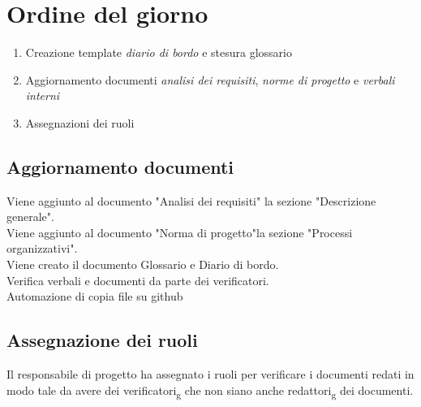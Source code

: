 \section{Ordine del giorno}
\begin{enumerate}
\item Creazione template\textit{ diario di bordo} e stesura glossario
\item Aggiornamento documenti \textit{analisi dei requisiti}, \textit{norme di progetto} e \textit{verbali interni}
\item Assegnazioni dei ruoli
\end{enumerate}

\subsection{Aggiornamento documenti}
Viene aggiunto al documento "Analisi dei requisiti" la sezione "Descrizione generale".\\ 
Viene aggiunto al documento "Norma di progetto"la sezione "Processi organizzativi".\\
Viene creato il documento Glossario e Diario di bordo.\\
Verifica verbali e documenti da parte dei verificatori.\\
Automazione di copia file su github
\subsection{Assegnazione dei ruoli}
Il responsabile di progetto ha assegnato i ruoli per verificare i documenti redati in modo tale da avere
dei verificatori\textsubscript{g} che non siano anche redattori\textsubscript{g} dei documenti.